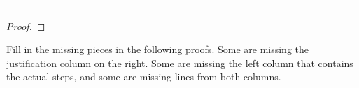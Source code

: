\begin{exercises}
\begin{longtabu}{X[1.4]X[1]}
\\
\end{longtabu}


\vspace{-1cm}
\item \textcolor{white}{.}  
\vspace{-16pt}
	\begin{proof}
		 
	  
	 
	  
	  
	 
	  
	 
	  
	\end{proof}

\end{exercises}



\noindent\problempart \label{pr.justifySLproof} Fill in the missing pieces in the following proofs. Some are missing the justification column on the right. Some are missing the left column that contains the actual steps, and some are missing lines from both columns.

